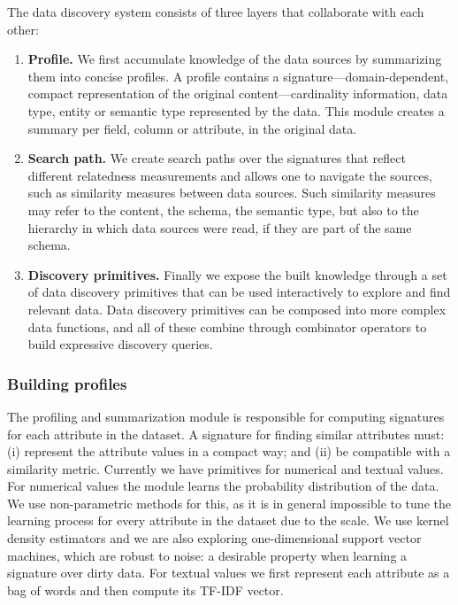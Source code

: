 
The data discovery system consists of three layers that collaborate with each other:

\begin{enumerate}
\item {\bf Profile.} We first accumulate knowledge of the data sources by summarizing them
into concise profiles. A profile contains a signature---domain-dependent,
compact representation of the original content---cardinality information, data
type, entity or semantic type represented by the data. This module creates a
summary per field, \ie column or attribute, in the original data.
\item {\bf Search path.} We create search paths over the signatures that reflect different relatedness
measurements and allows one to navigate the sources, such as similarity measures
between data sources. Such similarity measures may refer to the content, the
schema, the semantic type, but also to the hierarchy in which data sources were
read, \ie if they are part of the same schema.
\item {\bf Discovery primitives.} Finally we expose the built knowledge through a set of data discovery
primitives that can be used interactively to explore and find relevant data.
Data discovery primitives can be composed into more complex data functions, and
all of these combine through combinator operators to build expressive discovery
queries.
\end{enumerate}


\subsubsection{Building profiles}

The profiling and summarization module is responsible
for computing signatures for each attribute in the dataset. A signature for
finding similar attributes must: (i) represent the attribute values in a compact
way; and (ii) be compatible with a similarity metric. Currently we have
primitives for numerical and textual values. For numerical values the module
learns the probability distribution of the data. We use non-parametric methods
for this, as it is in general impossible to tune the learning process for every
attribute in the dataset due to the scale. We use kernel density estimators and
we are also exploring one-dimensional support vector machines, which are robust
to noise: a desirable property when learning a signature over dirty data. For
textual values we first represent each attribute as a bag of words and then
compute its TF-IDF vector.

